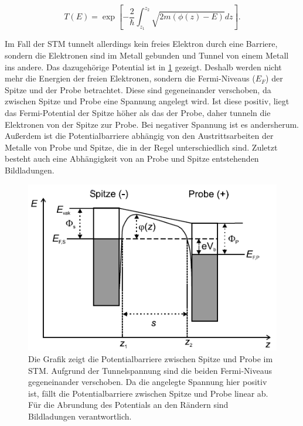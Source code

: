 \documentclass[
	a4paper,
	12pt,
	pagesize,
	ngerman
]{scrartcl}
\begin{document}
\begin{equation}
	T(E) = \exp [-\frac{2}{\hbar} \int_{z_1}^{z_2}\sqrt{2m(\phi(z) - E)}dz].
\end{equation}

Im Fall der STM tunnelt allerdings kein freies Elektron durch eine Barriere, sondern die Elektronen sind im Metall gebunden und Tunnel von einem Metall ins andere. Das dazugehörige Potential ist in \cref{barrier} gezeigt. Deshalb werden nicht mehr die Energien der freien Elektronen, sondern die Fermi-Niveaus ($E_F$) der Spitze und der Probe betrachtet. Diese sind gegeneinander verschoben, da zwischen Spitze und Probe eine Spannung angelegt wird. Ist diese positiv, liegt das Fermi-Potential der Spitze höher als das der Probe, daher tunneln die Elektronen von der Spitze zur Probe. Bei negativer Spannung ist es andersherum. Außerdem ist die Potentialbarriere abhängig von den Austrittsarbeiten der Metalle von Probe und Spitze, die in der Regel unterschiedlich sind. Zuletzt besteht auch eine Abhängigkeit von an Probe und Spitze entstehenden Bildladungen.

\begin{figure}[h!]
	\centering
	\includegraphics[scale = 1.2]{barrier.png}
	\caption{Die Grafik zeigt die Potentialbarriere zwischen Spitze und Probe im STM. Aufgrund der Tunnelspannung sind die beiden Fermi-Niveaus gegeneinander verschoben. Da die angelegte Spannung hier positiv ist, fällt die Potentialbarriere zwischen Spitze und Probe linear ab. Für die Abrundung des Potentials an den Rändern sind Bildladungen verantwortlich.}
	\label{barrier}
\end{figure}
\end{document}
